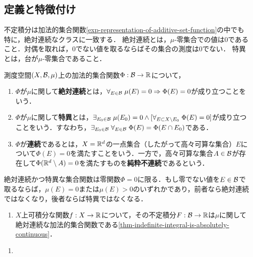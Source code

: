 \documentclass[uplatex, dvipdfmx]{jsreport}
\begin{document}
\subsection{定義と特徴付け}

\begin{tcolorbox}[colframe=ForestGreen, colback=ForestGreen!10!white,breakable,colbacktitle=ForestGreen!40!white,coltitle=black,fonttitle=\bfseries\sffamily,
title=]
    不定積分は加法的集合関数\ref{exp-representation-of-additive-set-function}の中でも特に，絶対連続なクラスに一致する．
    絶対連続とは，$\mu$-零集合での値は$0$であること．対偶を取れば，$0$でない値を取るならばその集合の測度は$0$でない．
    特異とは，台が$\mu$-零集合であること．
\end{tcolorbox}

\begin{definition}
    測度空間$(X,\mathcal{B},\mu)$上の加法的集合関数$\Phi:\mathcal{B}\to\mathbb{R}$について，
    \begin{enumerate}
        \item $\Phi$が$\mu$に関して\textbf{絶対連続}とは，$\forall_{E\in\mathcal{B}}\;\mu(E)=0\Rightarrow\Phi(E)=0$が成り立つことをいう．
        \item $\Phi$が$\mu$に関して\textbf{特異}とは，$\exists_{E_0\in\mathcal{B}}\;\mu(E_0)=0\land[\forall_{E\subset X\setminus E_0}\;\Phi(E)=0]$が成り立つことをいう．すなわち，$\exists_{E_0\in\mathcal{B}}\;\forall_{E\in\mathcal{B}}\;\Phi(E)=\Phi(E\cap E_0)$である．
        \item $\Phi$が\textbf{連続}であるとは，$X=\mathbb{R}^d$の一点集合（したがって高々可算な集合）$E$について$\Phi(E)=0$を満たすことをいう．一方で，高々可算な集合$A\in\mathcal{B}$が存在して$\Phi(\mathbb{R}^d\setminus A)=0$を満たすものを\textbf{純粋不連続}であるという．
    \end{enumerate}
\end{definition}
\begin{remark}
    絶対連続かつ特異な集合関数は零関数$\Phi=0$に限る．もし零でない値を$E\in\mathcal{B}$で取るならば，$\mu(E)=0$または$\mu(E)>0$のいずれかであり，前者なら絶対連続ではなくなり，後者ならば特異ではなくなる．
\end{remark}
\begin{example}[絶対連続な加法的集合関数]\mbox{}\label{exp-absolutely-continuous-set-functions}
    \begin{enumerate}
        \item $X$上可積分な関数$f:X\to\mathbb{R}$について，その不定積分$F:\mathcal{B}\to\mathbb{R}$は$\mu$に関して絶対連続な加法的集合関数である\ref{thm-indefinite-integral-is-absolutely-continuous}．
    \end{enumerate}
\end{example}
\begin{example}[特異な加法的集合関数]\mbox{}
    \begin{enumerate}
        \item 
    \end{enumerate}
\end{example}
\end{document}
